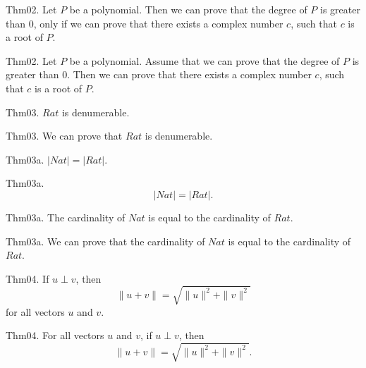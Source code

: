 \documentclass{article}
\begin{document}
Thm02. Let $P$ be a polynomial. Then we can prove that the degree of $P$ is greater than $0$, only if we can prove that there exists a complex number $c$, such that $c$ is a root of $P$.

Thm02. Let $P$ be a polynomial. Assume that we can prove that the degree of $P$ is greater than $0$. Then we can prove that there exists a complex number $c$, such that $c$ is a root of $P$.

Thm03. $Rat$ is denumerable.

Thm03. We can prove that $Rat$ is denumerable.

Thm03a. $| Nat | = | Rat |$.

Thm03a. $$| Nat | = | Rat |.$$

Thm03a. The cardinality of $Nat$ is equal to the cardinality of $Rat$.

Thm03a. We can prove that the cardinality of $Nat$ is equal to the cardinality of $Rat$.

Thm04. If $u \perp v$, then $$\| u + v \| = \sqrt{ \| u \| ^{ 2}+ \| v \| ^{ 2}}$$ for all vectors $u$ and $v$.

Thm04. For all vectors $u$ and $v$, if $u \perp v$, then $$\| u + v \| = \sqrt{ \| u \| ^{ 2}+ \| v \| ^{ 2}}.$$
\end{document}
